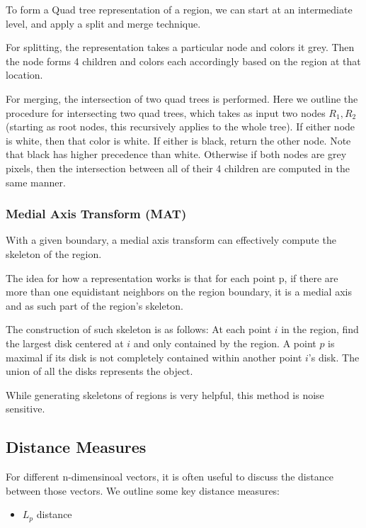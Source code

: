 \documentclass{article}
\begin{document}
\begin{multicols}{2}
To form a Quad tree representation of a region, we can start at an intermediate level, and apply a split and merge technique. 

For splitting, the representation takes a particular node and colors it grey. Then the node forms 4 children and colors each accordingly based on the region at that location. 

For merging, the intersection of two quad trees is performed. Here we outline the procedure for intersecting two quad trees, which takes as input two nodes $R_1, R_2$ (starting as root nodes, this recursively applies to the whole tree). If either node is white, then that color is white. If either is black, return the other node. Note that black has higher precedence than white. Otherwise if both nodes are grey pixels, then the intersection between all of their 4 children are computed in the same manner.

\subsubsection{Medial Axis Transform (MAT)}

With a given boundary, a medial axis transform can effectively compute the skeleton of the region.

The idea for how a representation works is that for each point p, if there are more than one equidistant neighbors on the region boundary, it is a medial axis and as such part of the region's skeleton.

The construction of such skeleton is as follows: At each point $i$ in the region, find the largest disk centered at $i$ and only contained by the region. A point $p$ is maximal if its disk is not completely contained within another point $i$'s disk. The union of all the disks represents the object.

While generating skeletons of regions is very helpful, this method is noise sensitive.

\subsection{Distance Measures}

For different n-dimensinoal vectors, it is often useful to discuss the distance between those vectors. We outline some key distance measures:

\begin{itemize}

\item $L_p$ distance
  

\end{itemize}
\end{multicols}
\end{document}
